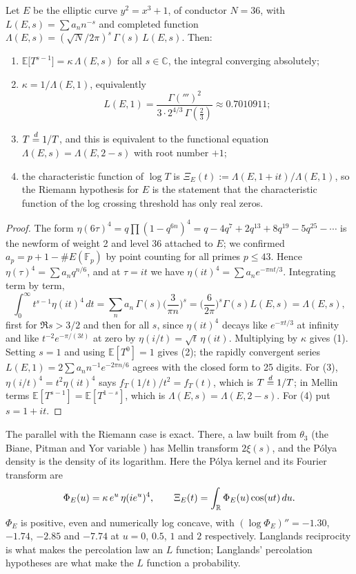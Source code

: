 \begin{theorem}\label{perc:thm:main}
Let $E$ be the elliptic curve $y^2 = x^3+1$, of conductor $N = 36$, with $L(E,s) = \sum a_nn^{-s}$ and completed function $\Lambda(E,s) = (\sqrt N/2\pi)^s\,\Gamma(s)\,L(E,s)$. Then:
\begin{enumerate}
\item $\mathbb{E}\big[T^{s-1}\big] = \kappa\,\Lambda(E,s)$ for all $s\in\mathbb{C}$, the integral converging absolutely;
\item $\kappa = 1/\Lambda(E,1)$, equivalently
\[
L(E,1) = \frac{\Gamma(\third)^2}{3\cdot2^{4/3}\,\Gamma(\tfrac23)}\approx0.7010911;
\]
\item $T\overset{d}{=}1/T$, and this is equivalent to the functional equation $\Lambda(E,s) = \Lambda(E,2-s)$ with root number $+1$;
\item the characteristic function of $\log T$ is $\Xi_E(t) := \Lambda(E,1+it)/\Lambda(E,1)$, so the Riemann hypothesis for $E$ is the statement that the characteristic function of the log crossing threshold has only real zeros.
\end{enumerate}
\end{theorem}
\begin{proof}
The form $\eta(6\tau)^4 = q\prod(1-q^{6n})^4 = q-4q^7+2q^{13}+8q^{19}-5q^{25}-\cdots$ is the newform of weight 2 and level 36 attached to $E$; we confirmed $a_p = p+1-\#E(\mathbb{F}_p)$ by point counting for all primes $p\le43$. Hence $\eta(\tau)^4 = \sum a_nq^{n/6}$, and at $\tau = it$ we have $\eta(it)^4 = \sum a_ne^{-\pi nt/3}$. Integrating term by term,
\[
\int_0^\infty t^{s-1}\eta(it)^4\,dt = \sum_na_n\,\Gamma(s)\Big(\frac{3}{\pi n}\Big)^s = \Big(\frac{6}{2\pi}\Big)^s\Gamma(s)L(E,s) = \Lambda(E,s),
\]
first for $\Re s>3/2$ and then for all $s$, since $\eta(it)^4$ decays like $e^{-\pi t/3}$ at infinity and like $t^{-2}e^{-\pi/(3t)}$ at zero by $\eta(i/t) = \sqrt t\,\eta(it)$. Multiplying by $\kappa$ gives (1). Setting $s = 1$ and using $\mathbb{E}[T^0] = 1$ gives (2); the rapidly convergent series $L(E,1) = 2\sum a_nn^{-1}e^{-2\pi n/6}$ agrees with the closed form to 25 digits. For (3), $\eta(i/t)^4 = t^2\eta(it)^4$ says $f_T(1/t)/t^2 = f_T(t)$, which is $T\overset{d}{=}1/T$; in Mellin terms $\mathbb{E}[T^{s-1}] = \mathbb{E}[T^{1-s}]$, which is $\Lambda(E,s) = \Lambda(E,2-s)$. For (4) put $s = 1+it$.
\end{proof}

The parallel with the Riemann case is exact. There, a law built from $\theta_3$ (the Biane, Pitman and Yor variable \cite{bpy2001}) has Mellin transform $2\xi(s)$, and the Pólya density is the density of its logarithm. Here the Pólya kernel and its Fourier transform are
\[
\Phi_E(u) = \kappa\,e^u\,\eta(ie^u)^4,\qquad \Xi_E(t) = \int_{\mathbb{R}}\Phi_E(u)\cos(ut)\,du.
\]
$\Phi_E$ is positive, even and numerically log concave, with $(\log\Phi_E)'' = -1.30$, $-1.74$, $-2.85$ and $-7.74$ at $u = 0$, $0.5$, $1$ and $2$ respectively. Langlands reciprocity is what makes the percolation law an $L$ function; Langlands' percolation hypotheses are what make the $L$ function a probability.

